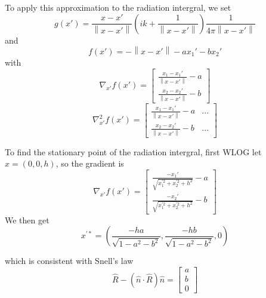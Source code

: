 \documentclass{article}
\newcommand{\norm}[1]{\left\lVert #1 \right\rVert}
\theoremstyle{plain}
\begin{document}
To apply this approximation to the radiation intergral,
we set
\begin{equation}
	g(x') = 
	\frac{x-x'}{\norm{x-x'}}
	\left( ik + \frac{1}{\norm{x-x'}} \right)
	\frac{1}{4\pi\norm{x-x'}}
\end{equation}
and
\begin{equation}
	f(x') = -\norm{x-x'} - ax_1' - bx_2'
\end{equation}
with
\begin{equation}
	\nabla_{x'} f(x') =
	\begin{bmatrix}
		\frac{x_1 - x_1'}{\norm{x-x'}} - a \\
		\frac{x_2 - x_2'}{\norm{x-x'}} - b
	\end{bmatrix}
\end{equation}
\begin{equation} %
	\nabla^2_{x'} f(x') =
	\begin{bmatrix}
		\frac{x_1 - x_1'}{\norm{x-x'}} - a & ... \\
		\frac{x_2 - x_2'}{\norm{x-x'}} - b & ...
	\end{bmatrix}
\end{equation}

To find the stationary point of the radiation intergral, first WLOG let $x=(0,0,h)$,
so the gradient is
\begin{equation}
	\nabla_{x'} f(x') = 
	\begin{bmatrix}
		\frac{-x_1'}{\sqrt{x_1^{'2} + x_2^{'2} + h^2}} - a \\
		\frac{-x_2'}{\sqrt{x_1^{'2} + x_2^{'2} + h^2}} - b
	\end{bmatrix}
\end{equation} %
We then get
\begin{equation}
	x^{'*} = \left( \frac{-ha}{\sqrt{ 1 - a^2 - b^2 }}, \frac{-hb}{\sqrt{ 1 - a^2 - b^2 }}, 0 \right)
\end{equation}








which is consistent with Snell's law
\begin{equation}
	\hat{R} - \left( \hat{n}\cdot\hat{R} \right)\hat{n} = 
	\begin{bmatrix}
		a \\
		b \\
		0
	\end{bmatrix}
\end{equation}
\end{document}
